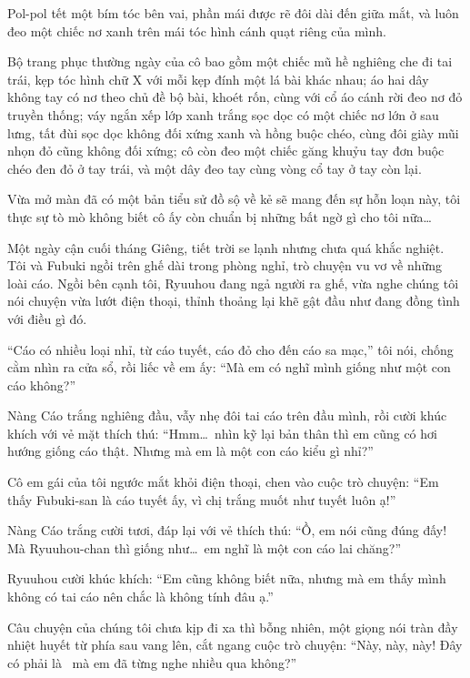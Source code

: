 \documentclass[../main.tex]{subfiles}
\begin{document}
Pol-pol tết một bím tóc bên vai, phần mái được rẽ đôi dài đến giữa mắt, và luôn đeo một chiếc nơ xanh trên mái tóc hình cánh quạt riêng của mình.

Bộ trang phục thường ngày của cô bao gồm một chiếc mũ hề nghiêng che đi tai trái, kẹp tóc hình chữ X với mỗi kẹp đính một lá bài khác nhau; áo hai dây không tay có nơ theo chủ đề bộ bài, khoét rốn, cùng với cổ áo cánh rời đeo nơ đỏ truyền thống; váy ngắn xếp lớp xanh trắng sọc dọc có một chiếc nơ lớn ở sau lưng, tất đùi sọc dọc không đối xứng xanh và hồng buộc chéo, cùng đôi giày mũi nhọn đỏ cũng không đối xứng; cô còn đeo một chiếc găng khuỷu tay đơn buộc chéo đen đỏ ở tay trái, và một dây đeo tay cùng vòng cổ tay ở tay còn lại.

\chrint

Vừa mở màn đã có một bản tiểu sử đồ sộ về kẻ sẽ mang đến sự hỗn loạn này, tôi thực sự tò mò không biết cô ấy còn chuẩn bị những bất ngờ gì cho tôi nữa\dots

\il

Một ngày cận cuối tháng Giêng, tiết trời se lạnh nhưng chưa quá khắc nghiệt. Tôi và Fubuki ngồi trên ghế dài trong phòng nghỉ, trò chuyện vu vơ về những loài cáo. Ngồi bên cạnh tôi, Ryuuhou đang ngả người ra ghế, vừa nghe chúng tôi nói chuyện vừa lướt điện thoại, thỉnh thoảng lại khẽ gật đầu như đang đồng tình với điều gì đó.

``Cáo có nhiều loại nhỉ, từ cáo tuyết, cáo đỏ cho đến cáo sa mạc,'' tôi nói, chống cằm nhìn ra cửa sổ, rồi liếc về em ấy: ``Mà em có nghĩ mình giống như một con cáo không?''

Nàng Cáo trắng nghiêng đầu, vẫy nhẹ đôi tai cáo trên đầu mình, rồi cười khúc khích với vẻ mặt thích thú: ``Hmm\dots\ nhìn kỹ lại bản thân thì em cũng có hơi hướng giống cáo thật. Nhưng mà em là một con cáo kiểu gì nhỉ?''

Cô em gái của tôi ngước mắt khỏi điện thoại, chen vào cuộc trò chuyện: ``Em thấy Fubuki-san là cáo tuyết ấy, vì chị trắng muốt như tuyết luôn ạ!''

Nàng Cáo trắng cười tươi, đáp lại với vẻ thích thú: ``Ồ, em nói cũng đúng đấy! Mà Ryuuhou-chan thì giống như\dots\ em nghĩ là một con cáo lai chăng?''

Ryuuhou cười khúc khích: ``Em cũng không biết nữa, nhưng mà em thấy mình không có tai cáo nên chắc là không tính đâu ạ.''

Câu chuyện của chúng tôi chưa kịp đi xa thì bỗng nhiên, một giọng nói tràn đầy nhiệt huyết từ phía sau vang lên, cắt ngang cuộc trò chuyện: ``Này, này, này! Đây có phải là \hll\ mà em đã từng nghe nhiều qua không?''
\end{document}
